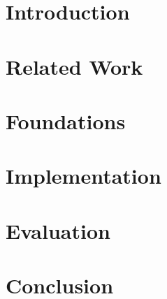 \documentclass[smallcondensed]{svjour3}     %
\begin{document}
\section{Introduction}
\label{sec:introduction}


\section{Related Work}
\label{sec:related-work}


\section{Foundations}

\section{Implementation}
\label{sec:implementation}


\section{Evaluation}

\section{Conclusion}


\end{document}
